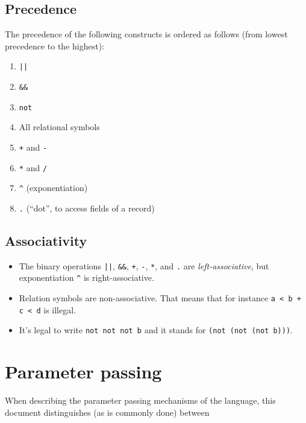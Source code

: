 \documentclass[11pt]{article}
\begin{document}
\subsection{Precedence}
\label{sec:orge2dfd3a}

The precedence of the following constructs is ordered as follows (from
lowest precedence to the highest):

\begin{enumerate}
\item \texttt{||}
\item \texttt{\&\&}
\item \texttt{not}
\item All relational symbols
\item \texttt{+} and \texttt{-}
\item \texttt{*} and \texttt{/}
\item \texttt{\textasciicircum{}} (exponentiation)
\item \texttt{.} (``dot'', to access fields of a record)
\end{enumerate}


\subsection{Associativity}
\label{sec:org61e8762}

\begin{itemize}
\item The binary operations \texttt{||}, \texttt{\&\&}, \texttt{+}, \texttt{-}, \texttt{*}, and \texttt{.} are
\emph{left-associative}, but exponentiation \texttt{\textasciicircum{}} is right-associative.

\item Relation symbols are non-associative. That means that for instance \texttt{a < b + c < d} is illegal.

\item It's legal to write \texttt{not not not b} and it stands for \texttt{(not (not (not b)))}.
\end{itemize}



\section{Parameter passing}
\label{sec:org2311157}


When describing the parameter passing mechanisms of the language, this
document distinguishes (as is commonly done) between
\end{document}
